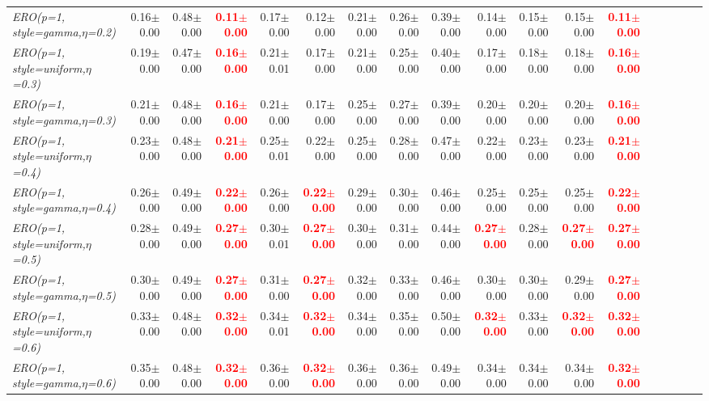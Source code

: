 \documentclass[nohyperref]{article}
\theoremstyle{plain}
\theoremstyle{definition}
\theoremstyle{remark}
\newcommand{\red}[1]{\textcolor{red}{\textbf{#1}}}
\begin{document}
\begin{table*}[!ht]
{\begin{tabular}{lrrrrrrrrrrrrrrrrr}
			{\it ERO(p=1, style=gamma,$\eta$=0.2)} & 0.16$\pm$0.00 & 0.48$\pm$0.00 & \red{0.11$\pm$0.00} & 0.17$\pm$0.00 & 0.12$\pm$0.00 & 0.21$\pm$0.00 & 0.26$\pm$0.00 & 0.39$\pm$0.00 & 0.14$\pm$0.00 & 0.15$\pm$0.00  & 0.15$\pm$0.00 & \red{0.11$\pm$0.00} \\
			{\it ERO(p=1, style=uniform,$\eta$=0.3)} & 0.19$\pm$0.00 & 0.47$\pm$0.00 & \red{0.16$\pm$0.00} & 0.21$\pm$0.01 & 0.17$\pm$0.00 & 0.21$\pm$0.00 & 0.25$\pm$0.00 & 0.40$\pm$0.00 & 0.17$\pm$0.00 & 0.18$\pm$0.00  & 0.18$\pm$0.00 & \red{0.16$\pm$0.00} \\
			{\it ERO(p=1, style=gamma,$\eta$=0.3)} & 0.21$\pm$0.00 & 0.48$\pm$0.00 & \red{0.16$\pm$0.00} & 0.21$\pm$0.00 & 0.17$\pm$0.00 & 0.25$\pm$0.00 & 0.27$\pm$0.00 & 0.39$\pm$0.00 & 0.20$\pm$0.00 & 0.20$\pm$0.00  & 0.20$\pm$0.00 & \red{0.16$\pm$0.00} \\
			{\it ERO(p=1, style=uniform,$\eta$=0.4)} & 0.23$\pm$0.00 & 0.48$\pm$0.00 & \red{0.21$\pm$0.00} & 0.25$\pm$0.01 & 0.22$\pm$0.00 & 0.25$\pm$0.00 & 0.28$\pm$0.00 & 0.47$\pm$0.00 & 0.22$\pm$0.00 & 0.23$\pm$0.00  & 0.23$\pm$0.00 & \red{0.21$\pm$0.00} \\
			{\it ERO(p=1, style=gamma,$\eta$=0.4)} & 0.26$\pm$0.00 & 0.49$\pm$0.00 & \red{0.22$\pm$0.00} & 0.26$\pm$0.00 & \red{0.22$\pm$0.00} & 0.29$\pm$0.00 & 0.30$\pm$0.00 & 0.46$\pm$0.00 & 0.25$\pm$0.00 & 0.25$\pm$0.00  & 0.25$\pm$0.00 & \red{0.22$\pm$0.00} \\
			{\it ERO(p=1, style=uniform,$\eta$=0.5)} & 0.28$\pm$0.00 & 0.49$\pm$0.00 & \red{0.27$\pm$0.00} & 0.30$\pm$0.01 & \red{0.27$\pm$0.00} & 0.30$\pm$0.00 & 0.31$\pm$0.00 & 0.44$\pm$0.00 & \red{0.27$\pm$0.00} & 0.28$\pm$0.00  & \red{0.27$\pm$0.00} & \red{0.27$\pm$0.00} \\
			{\it ERO(p=1, style=gamma,$\eta$=0.5)} & 0.30$\pm$0.00 & 0.49$\pm$0.00 & \red{0.27$\pm$0.00} & 0.31$\pm$0.00 & \red{0.27$\pm$0.00} & 0.32$\pm$0.00 & 0.33$\pm$0.00 & 0.46$\pm$0.00 & 0.30$\pm$0.00 & 0.30$\pm$0.00  & 0.29$\pm$0.00 & \red{0.27$\pm$0.00} \\
			{\it ERO(p=1, style=uniform,$\eta$=0.6)} & 0.33$\pm$0.00 & 0.48$\pm$0.00 & \red{0.32$\pm$0.00} & 0.34$\pm$0.01 & \red{0.32$\pm$0.00} & 0.34$\pm$0.00 & 0.35$\pm$0.00 & 0.50$\pm$0.00 & \red{0.32$\pm$0.00} & 0.33$\pm$0.00  & \red{0.32$\pm$0.00} & \red{0.32$\pm$0.00} \\
			{\it ERO(p=1, style=gamma,$\eta$=0.6)} & 0.35$\pm$0.00 & 0.48$\pm$0.00 & \red{0.32$\pm$0.00} & 0.36$\pm$0.00 & \red{0.32$\pm$0.00} & 0.36$\pm$0.00 & 0.36$\pm$0.00 & 0.49$\pm$0.00 & 0.34$\pm$0.00 & 0.34$\pm$0.00  & 0.34$\pm$0.00 & \red{0.32$\pm$0.00} \\

\end{tabular}}
\end{table*}
\end{document}
